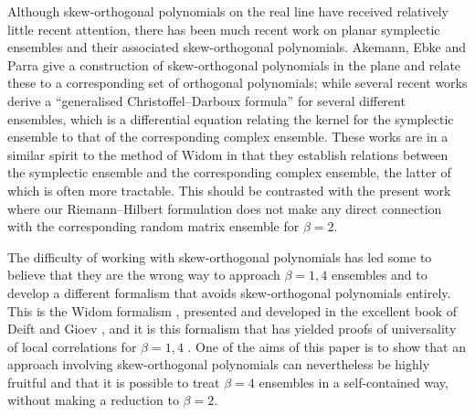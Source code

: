 \documentclass[pdftex]{sigma}
\numberwithin{equation}{section}
\begin{document}
Although skew-orthogonal polynomials on the real line have received relatively little recent attention, there has been much recent work on planar symplectic ensembles and their associated skew-orthogonal polynomials. Akemann, Ebke and Parra \cite{Akemann:2022aa} give a construction of skew-orthogonal polynomials in the plane and relate these to a corresponding set of orthogonal polynomials; while several recent works \cite{doi:10.1142/S2010326322500472,Byun_2023,byun2024scaling} derive a \enquote{generalised Christoffel--Darboux formula} for several different ensembles, which is a differential equation relating the kernel for the symplectic ensemble to that of the corresponding complex ensemble. These works are in a similar spirit to the method of Widom \cite{Widom:1999aa} in that they establish relations between the symplectic ensemble and the corresponding complex ensemble, the latter of which is often more tractable. This should be contrasted with the present work where our Riemann--Hilbert formulation does not make any direct connection with the corresponding random matrix ensemble for $\beta = 2$.

The difficulty of working with skew-orthogonal polynomials has led some to believe that they are the wrong way to approach $\beta = 1,4$ ensembles and to develop a different formalism that avoids skew-orthogonal polynomials entirely. This is the Widom formalism \cite{Widom:1999aa}, presented and developed in the excellent book of Deift and Gioev \cite{deiftuniversality}, and it is this formalism that has yielded proofs of universality of local correlations for $\beta=1,4$ \cite{https://doi.org/10.1002/cpa.20164,10.1093/imrp/rpm004,Deift:2007aa,kriecherbauer2010fluctuations,Shcherbina:2009aa,Shcherbina:2009ab,Shcherbina:2011aa,Stojanovic:2000aa}. One of the aims of this paper is to show that an approach involving skew-orthogonal polynomials can nevertheless be highly fruitful and that it is possible to treat $\beta = 4$ ensembles in a self-contained way, without making a reduction to $\beta = 2$.
\end{document}
